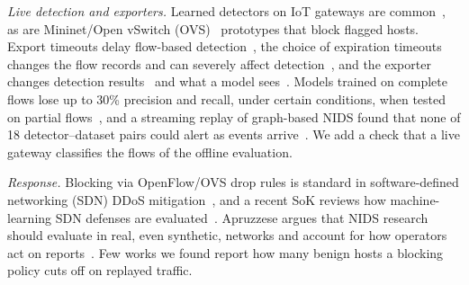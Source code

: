 \emph{Live detection and exporters.} Learned detectors on IoT gateways are common~\cite{realguard2022}, as are Mininet/Open vSwitch (OVS)~\cite{lantz2010mininet,pfaff2015ovs} prototypes that block flagged hosts. Export timeouts delay flow-based detection~\cite{hofstede2013realtime}, the choice of expiration timeouts changes the flow records and can severely affect detection~\cite{velan2020impact}, and the exporter changes detection results~\cite{pinto2025flowexporter,pinto2025hera} and what a model sees~\cite{vitorino2025revisiting}. Models trained on complete flows lose up to 30\% precision and recall, under certain conditions, when tested on partial flows~\cite{pekar2025early}, and a streaming replay of graph-based NIDS found that none of 18 detector--dataset pairs could alert as events arrive~\cite{zhao2026gidseval}. We add a check that a live gateway classifies the flows of the offline evaluation.

\emph{Response.} Blocking via OpenFlow/OVS drop rules is standard in software-defined networking (SDN) DDoS mitigation~\cite{bawany2017ddos,yan2016sdn}, and a recent SoK reviews how machine-learning SDN defenses are evaluated~\cite{orsdemir2026sok}. Apruzzese argues that NIDS research should evaluate in real, even synthetic, networks and account for how operators act on reports~\cite{apruzzese2026reshaping}. Few works we found report how many benign hosts a blocking policy cuts off on replayed traffic.
